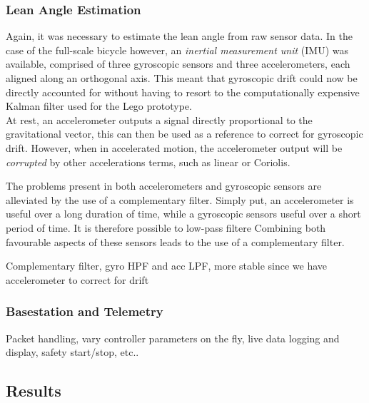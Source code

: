 \subsubsection{Lean Angle Estimation}
Again, it was necessary to estimate the lean angle from raw sensor data. In the case of the full-scale bicycle however, an \textit{inertial measurement unit} (IMU) was available, comprised of three gyroscopic sensors and three accelerometers, each aligned along an orthogonal axis. This meant that gyroscopic drift could now be directly accounted for without having to resort to the computationally expensive Kalman filter used for the Lego prototype.\\

At rest, an accelerometer outputs a signal directly proportional to the gravitational vector, this can then be used as a reference to correct for gyroscopic drift. However, when in accelerated motion, the accelerometer output will be \textit{corrupted} by other accelerations terms, such as linear or Coriolis.

The problems present in both accelerometers and gyroscopic sensors are alleviated by the use of a complementary filter. Simply put, an accelerometer is useful over a long duration of time, while a gyroscopic sensors useful over a short period of time. It is therefore possible to low-pass filtere Combining both favourable aspects of these sensors leads to the use of a complementary filter. 

Complementary filter, gyro HPF and acc LPF, more stable since we have accelerometer to correct for drift

\subsubsection{Basestation and Telemetry}
Packet handling, vary controller parameters on the fly, live data logging and display, safety start/stop, etc..

\subsection{Results}